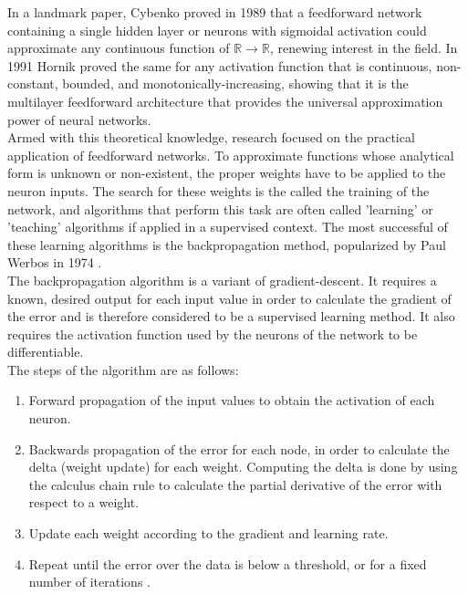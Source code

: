 \documentclass[12pt,oneside]{CUNY_CS_PhD}
\begin{document}
\newpage
In a landmark paper, Cybenko \cite{cybenko1989approximation} proved in 1989 that a feedforward network containing a single hidden layer or neurons with sigmoidal activation could approximate any continuous function of $\mathbb{R} \rightarrow \mathbb{R}$, renewing interest in the field. In 1991 Hornik \cite{Hornik:1991} proved the same for any activation function that is continuous, non-constant, bounded, and monotonically-increasing, showing that it is the multilayer feedforward architecture that provides the universal approximation power of neural networks.\\
Armed with this theoretical knowledge, research focused on the practical application of feedforward networks. To approximate functions whose analytical form is unknown or non-existent, the proper weights have to be applied to the neuron inputs. The search for these weights is the called the training of the network, and algorithms that perform this task are often called 'learning' or 'teaching' algorithms if applied in a supervised context. The most successful of these learning algorithms is the backpropagation method, popularized by Paul Werbos in 1974 \cite{werbos_backpropagation_1990}.\\
The backpropagation algorithm is a variant of gradient-descent.
It requires a known, desired output for each input value in order to calculate the gradient of the error and is therefore considered to be a supervised learning method. It also requires the activation function used by the neurons of the network to be differentiable.\\
The steps of the algorithm are as follows:
\begin{enumerate}
\item Forward propagation of the input values to obtain the activation of each neuron.
\item Backwards propagation of the error for each node, in order to calculate the delta (weight update) for each weight. Computing the delta is done by using the calculus chain rule to calculate the partial derivative of the error with respect to a  weight.
\item Update each weight according to the gradient and learning rate. %
\item Repeat until the error over the data is below a threshold, or for a fixed number of iterations .
\end{enumerate}
\end{document}
